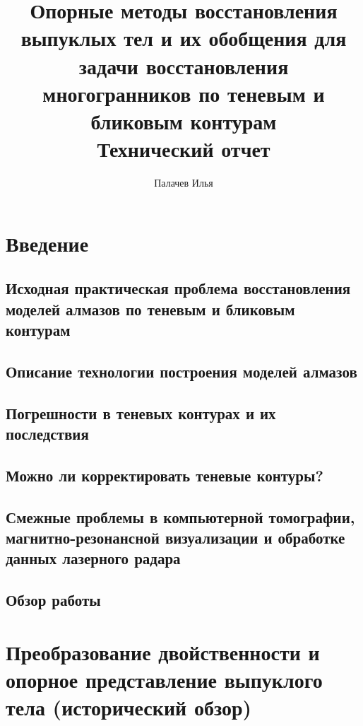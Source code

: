 \documentclass[a4paper, 12pt, titlepage]{article}
\title{Опорные методы восстановления выпуклых тел и их обобщения для задачи
восстановления многогранников по теневым и бликовым контурам \\ Технический
отчет}
\author{Палачев Илья}
\theoremstyle{definition}
\theoremstyle{plain}
\theoremstyle{plain}
\begin{document}
\maketitle

\tableofcontents


\section{Введение}

\subsection{Исходная практическая проблема восстановления моделей алмазов по
теневым и бликовым контурам}

\subsection{Описание технологии построения моделей алмазов}

\subsection{Погрешности в теневых контурах и их последствия}

\subsection{Можно ли корректировать теневые контуры?}

\subsection{Смежные проблемы в компьютерной томографии, магнитно-резонансной
визуализации и обработке данных лазерного радара}

\subsection{Обзор работы}


\section{Преобразование двойственности и опорное представление
выпуклого тела (исторический обзор)}
\end{document}
